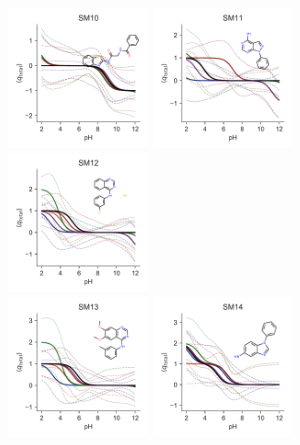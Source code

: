 \documentclass[9pt,lineno,final]{elife}
\begin{document}
	
\begin{figure}[hbt]	
	\centering
	\includegraphics[width=0.33\textwidth]{Reports/overview-SM10-titration-bootstrap-molecule.pdf}
	\includegraphics[width=0.33\textwidth]{Reports/overview-SM11-titration-bootstrap-molecule.pdf}
	\includegraphics[width=0.33\textwidth]{Reports/overview-SM12-titration-bootstrap-molecule.pdf}	 \\
	\includegraphics[width=0.33\textwidth]{Reports/overview-SM13-titration-bootstrap-molecule.pdf}
	\includegraphics[width=0.33\textwidth]{Reports/overview-SM14-titration-bootstrap-molecule.pdf}

\end{figure}
\end{document}
